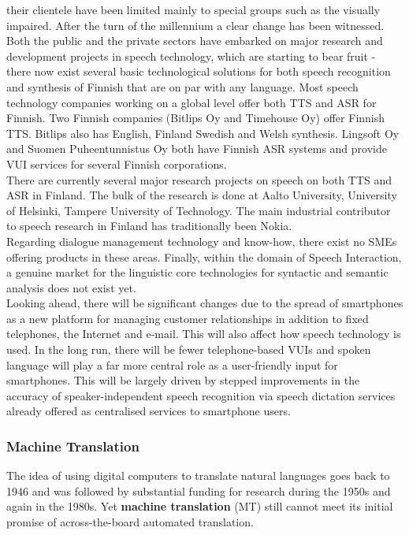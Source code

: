 \begin{multicols}{2}
their clientele have been limited mainly to special groups such as the visually
impaired. After the turn of the millennium a clear change has been witnessed.
Both the public and the private sectors have embarked on major research and
development projects in speech technology, which are starting to bear fruit -
there now exist several basic technological solutions for both speech
recognition and synthesis of Finnish that are on par with any language. Most
speech technology companies working on a global level offer both TTS and ASR
for Finnish. Two Finnish companies (Bitlips Oy and Timehouse Oy) offer Finnish
TTS. Bitlips also has English, Finland Swedish and Welsh synthesis. Lingsoft Oy
and Suomen Puheentunnistus Oy both have Finnish ASR systems and provide VUI
services for several Finnish corporations.\\
There are currently several major research projects on speech on both TTS and
ASR in Finland. The bulk of the research is done at Aalto University,
University of Helsinki, Tampere University of Technology. The main industrial
contributor to speech research in Finland has traditionally been Nokia.\\
Regarding dialogue management technology and know-how, there exist no SMEs
offering products in these areas. Finally, within the domain of Speech
Interaction, a genuine market for the linguistic core technologies for
syntactic and semantic analysis does not exist yet.\\
Looking ahead, there will be significant changes due to the spread of
smartphones as a new platform for managing customer relationships in addition
to fixed telephones, the Internet and e-mail. This will also affect how speech
technology is used. In the long run, there will be fewer
telephone-based VUIs and spoken language will play a far more central role as a
user-friendly input for smartphones. This will be largely driven by stepped
improvements in the accuracy of speaker-independent speech recognition via
speech dictation services already offered as centralised services to smartphone
users.

\subsubsection{Machine Translation}

The idea of using digital computers to translate natural languages goes back to
1946 and was followed by substantial funding for research during the 1950s and
again in the 1980s. Yet \textbf{machine translation} (MT) still cannot meet its initial
promise of across-the-board automated translation.


\end{multicols}
